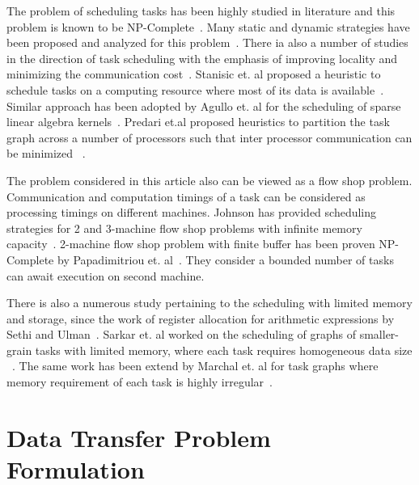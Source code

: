 \documentclass[sigconf]{acmart}
\begin{document}
	
	The problem of scheduling tasks has been highly studied in literature and this problem is known to be NP-Complete~\cite{GareyJohnson}. Many static and dynamic strategies have been proposed and analyzed for this problem~\cite{heft-Topcuoglu,hipc16multiresource,ipdps16starpu}. There ia also a number of studies in the direction of task scheduling with the emphasis of improving locality and minimizing the communication cost~\cite{starpu,heft-Topcuoglu}. Stanisic et. al proposed a heuristic to schedule tasks on a computing resource where most of its data is available~\cite{luka-dmdar}. Similar approach has been adopted by Agullo et. al for the scheduling of sparse linear algebra kernels~\cite{agullo_fmm}. Predari et.al proposed heuristics to partition the task graph across a number of processors such that inter processor communication can be minimized ~\cite{predari:tel-01518956}.
	
	The problem considered in this article also can be viewed as a flow shop problem. Communication and computation timings of a task can be considered as processing timings on different machines. Johnson has provided scheduling strategies for 2 and 3-machine flow shop problems with infinite memory capacity~\cite{johnson}. 2-machine flow shop problem with finite buffer has been proven NP-Complete by Papadimitriou et. al~\cite{Papadimitriou:1980:FSL:322203.322213}. They consider a bounded number of tasks can await execution on second machine.
	
	There is also a numerous study pertaining to the scheduling with limited memory and storage, since the work of register allocation for arithmetic expressions by Sethi and Ulman~\cite{Sethi:1970:GOC:321607.321620}. Sarkar et. al worked on the scheduling of graphs of smaller-grain tasks with limited memory, where each task requires homogeneous data size ~\cite{vsarkar-pact}. The same work has been extend by Marchal et. al for task graphs where memory requirement of each task is highly irregular~\cite{loris-ipdps18}.
	
	
	
	\section{Data Transfer Problem Formulation}
	\label{sec:theoreticalProof}
	
\end{document}
